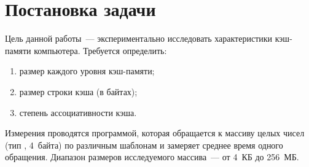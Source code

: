 \newpage
\section{Постановка задачи}

Цель данной работы~--- экспериментально исследовать характеристики кэш-памяти компьютера. Требуется определить:
\begin{enumerate}
  \item размер каждого уровня кэш-памяти;
  \item размер строки кэша (в байтах);
  \item степень ассоциативности кэша.
\end{enumerate}

Измерения проводятся программой, которая обращается к массиву целых чисел (тип , 4~байта) по различным шаблонам и замеряет среднее время одного обращения. Диапазон размеров исследуемого массива~--- от 4~КБ до 256~МБ.
